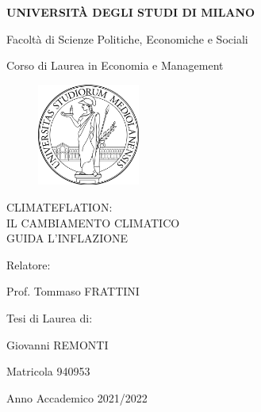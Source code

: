 
\begin{titlepage}

\begin{center}
    {\Large \uppercase{\textbf{Università degli Studi di Milano}}}
	
	\vspace{0.5cm}
    
    {\LARGE Facoltà di Scienze Politiche, Economiche e Sociali}
    
    \vspace{0.5cm}
    
    {\Large Corso di Laurea in Economia e Management}
\end{center}

\vspace{0.5cm}

\begin{figure}[h]
	\centering
	\includegraphics[width=95pt]{img/unimi-logo.pdf}
\end{figure}

\vspace{0.2cm}

\begin{center}
    {\Large CLIMATEFLATION:\\IL CAMBIAMENTO CLIMATICO\\GUIDA L'INFLAZIONE\par}
\end{center}

\vfill

\large Relatore:\par
\large Prof. Tommaso FRATTINI\par

\vspace{1.5cm}

\hspace{9cm}\large Tesi di Laurea di:\par
\hspace{9cm}\large Giovanni REMONTI\par
\hspace{9cm}\large Matricola 940953\par

\vspace{1.5cm}

\centering \large Anno Accademico 2021/2022\par

\end{titlepage}